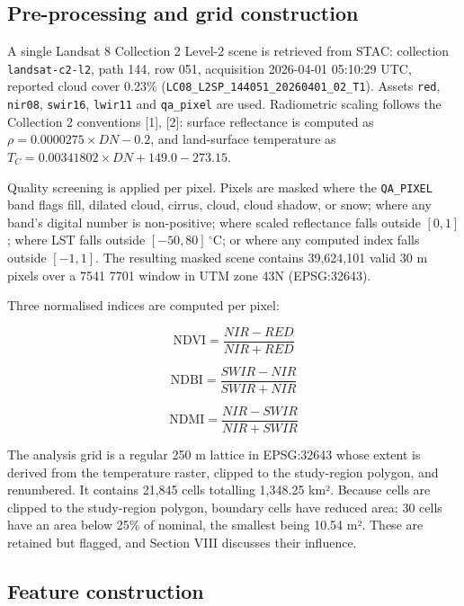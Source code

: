 \subsection{Pre-processing and grid construction}\label{b.-pre-processing-and-grid-construction}

A single Landsat 8 Collection 2 Level-2 scene is retrieved from STAC: collection \texttt{landsat-c2-l2},
path 144, row 051, acquisition 2026-04-01 05:10:29 UTC, reported cloud cover 0.23\%
(\texttt{LC08\_L2SP\_144051\_20260401\_02\_T1}). Assets \texttt{red}, \texttt{nir08}, \texttt{swir16}, \texttt{lwir11} and \texttt{qa\_pixel} are
used. Radiometric scaling follows the Collection 2 conventions {[}1{]}, {[}2{]}: surface reflectance is
computed as \(\rho = 0.0000275 \times DN - 0.2\), and land-surface temperature as
\(T_{C} = 0.00341802 \times DN + 149.0 - 273.15\).

Quality screening is applied per pixel. Pixels are masked where the \texttt{QA\_PIXEL} band flags fill,
dilated cloud, cirrus, cloud, cloud shadow, or snow; where any band's digital number is
non-positive; where scaled reflectance falls outside \([0, 1]\); where LST falls outside
\([-50, 80]\,^{\circ}\mathrm{C}\); or where any computed index falls outside \([-1, 1]\). The resulting
masked scene contains 39,624,101 valid 30 m pixels over a 7541 \texttimes{} 7701 window in UTM zone 43N
(EPSG:32643).

Three normalised indices are computed per pixel:

\[\mathrm{NDVI} = \frac{NIR - RED}{NIR + RED} \tag{1}\]

\[\mathrm{NDBI} = \frac{SWIR - NIR}{SWIR + NIR} \tag{2}\]

\[\mathrm{NDMI} = \frac{NIR - SWIR}{NIR + SWIR} \tag{3}\]

The analysis grid is a regular 250 m lattice in EPSG:32643 whose extent is derived from the
temperature raster, clipped to the study-region polygon, and renumbered. It contains 21,845 cells
totalling 1,348.25 km². Because cells are clipped to the study-region polygon, boundary cells have
reduced area; 30 cells have an area below 25\% of nominal, the smallest being 10.54 m². These are
retained but flagged, and Section VIII discusses their influence.

\subsection{Feature construction}\label{c.-feature-construction}

